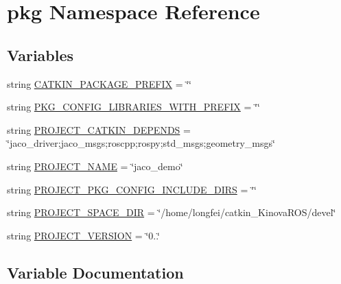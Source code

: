 \hypertarget{namespacepkg}{}\section{pkg Namespace Reference}
\label{namespacepkg}
\subsection*{Variables}
\begin{DoxyCompactItemize}
\item 
string \hyperlink{namespacepkg_ae26c7a5a06b7d738f4d210ca449e6bee}{C\+A\+T\+K\+I\+N\+\_\+\+P\+A\+C\+K\+A\+G\+E\+\_\+\+P\+R\+E\+F\+IX} = \char`\"{}\char`\"{}
\item 
string \hyperlink{namespacepkg_a433e30cecb4a0123a7c4b384d168e336}{P\+K\+G\+\_\+\+C\+O\+N\+F\+I\+G\+\_\+\+L\+I\+B\+R\+A\+R\+I\+E\+S\+\_\+\+W\+I\+T\+H\+\_\+\+P\+R\+E\+F\+IX} = \char`\"{}\char`\"{}
\item 
string \hyperlink{namespacepkg_a17c18447fad253ee1c0d76deec88028c}{P\+R\+O\+J\+E\+C\+T\+\_\+\+C\+A\+T\+K\+I\+N\+\_\+\+D\+E\+P\+E\+N\+DS} = \char`\"{}jaco\+\_\+driver;jaco\+\_\+msgs;roscpp;rospy;std\+\_\+msgs;geometry\+\_\+msgs\char`\"{}
\item 
string \hyperlink{namespacepkg_a7dfbe99257c26f5e4a3a5483995d9ddc}{P\+R\+O\+J\+E\+C\+T\+\_\+\+N\+A\+ME} = \char`\"{}jaco\+\_\+demo\char`\"{}
\item 
string \hyperlink{namespacepkg_a2760bf8266ff58da440f65ee91b203ab}{P\+R\+O\+J\+E\+C\+T\+\_\+\+P\+K\+G\+\_\+\+C\+O\+N\+F\+I\+G\+\_\+\+I\+N\+C\+L\+U\+D\+E\+\_\+\+D\+I\+RS} = \char`\"{}\char`\"{}
\item 
string \hyperlink{namespacepkg_a3f0f1b4bc03c596525e025539ca4332f}{P\+R\+O\+J\+E\+C\+T\+\_\+\+S\+P\+A\+C\+E\+\_\+\+D\+IR} = \char`\"{}/home/longfei/catkin\+\_\+\+Kinova\+R\+OS/devel\char`\"{}
\item 
string \hyperlink{namespacepkg_ab1037914b9286bb61855131c06149648}{P\+R\+O\+J\+E\+C\+T\+\_\+\+V\+E\+R\+S\+I\+ON} = \char`\"{}0..\char`\"{}
\end{DoxyCompactItemize}


\subsection{Variable Documentation}
